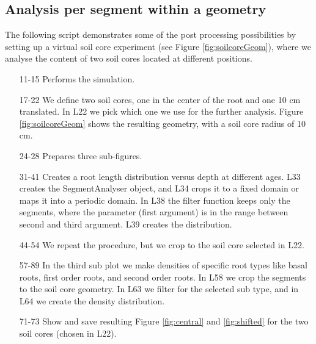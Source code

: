 \subsection{Analysis per segment within a geometry}

The following script demonstrates some of the post processing possibilities by setting up a virtual soil core experiment (see Figure \ref{fig:soilcoreGeom}), where we analyse the content of two soil cores located at different positions.



\begin{itemize}

\item[11-15] Performs the simulation.

\item[17-22] We define two soil cores, one in the center of the root and one 10 cm translated. In L22 we pick which one we use for the further analysis. Figure \ref{fig:soilcoreGeom} shows the resulting geometry, with a soil core radius of 10 cm.

\item[24-28] Prepares three sub-figures. 

\item[31-41] Creates a root length distribution versus depth at different ages. L33 creates the SegmentAnalyser object, and L34 crops it to a fixed domain or maps it into a periodic domain. In L38 the filter function keeps only the segments, where the parameter (first argument) is in the range between second and third argument. L39 creates the distribution. 

\item[44-54] We repeat the procedure, but we crop to the soil core selected in L22. 

\item[57-89] In the third sub plot we make densities of specific root types like basal roots, first order roots, and second order roots. In L58 we crop the segments to the soil core geometry. In L63 we filter for the selected sub type, and in L64 we create the density distribution.

\item[71-73] Show and save resulting Figure \ref{fig:central} and \ref{fig:shifted} for the two soil cores (chosen in L22).

\end{itemize}


